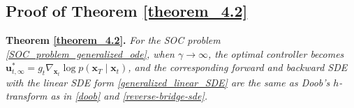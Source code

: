 
\subsection{Proof of Theorem \ref{theorem_4.2}}\label{proof_theorem_4.2}
\noindent \textbf{Theorem \ref{theorem_4.2}.} 
\textit{For the SOC problem \eqref{SOC_problem_generalized_ode}, when $\gamma \to \infty$, the optimal controller becomes $\mathbf{u}^{*}_{t, \infty} = g_t \nabla_{\mathbf{x}_t} \log p(\mathbf{x}_T \mid \mathbf{x}_t)$, and the corresponding forward and backward SDE with the linear SDE form \eqref{generalized_linear_SDE} are the same as Doob's $h$-transform as in \eqref{doob} and \eqref{reverse-bridge-sde}.}

